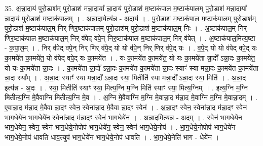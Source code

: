 \documentclass[17pt]{extarticle}
\begin{document}
35. अ॒न्ना॒दाय॑ पुरो॒डाश॑म् पुरो॒डाश॑ मन्ना॒दाया᳚ न्ना॒दाय॑ पुरो॒डाश॑ म॒ष्टाक॑पाल म॒ष्टाक॑पालम् पुरो॒डाश॑ मन्ना॒दाया᳚ न्ना॒दाय॑ पुरो॒डाश॑ म॒ष्टाक॑पालम् । . अ॒न्ना॒दायेत्य॑न्न - अ॒दाय॑ । . पु॒रो॒डाश॑ म॒ष्टाक॑पाल म॒ष्टाक॑पालम् पुरो॒डाश॑म् पुरो॒डाश॑ म॒ष्टाक॑पाल॒म् निर् णिर॒ष्टाक॑पालम् पुरो॒डाश॑म् पुरो॒डाश॑ म॒ष्टाक॑पाल॒म् निः । . अ॒ष्टाक॑पाल॒म् निर् णिर॒ष्टाक॑पाल म॒ष्टाक॑पाल॒म् निर् व॑पेद् वपे॒न् निर॒ष्टाक॑पाल म॒ष्टाक॑पाल॒म् निर् व॑पेत् । . अ॒ष्टाक॑पाल॒मित्य॒ष्टा - क॒पा॒ल॒म् । . निर् व॑पेद् वपे॒न् निर् णिर् व॑पे॒द् यो यो व॑पे॒न् निर् णिर् व॑पे॒द् यः । . व॒पे॒द् यो यो व॑पेद् वपे॒द् यः का॒मये॑त का॒मये॑त॒ यो व॑पेद् वपे॒द् यः का॒मये॑त । . यः का॒मये॑त का॒मये॑त॒ यो यः का॒मये॑ता न्ना॒दो᳚ ऽन्ना॒दः का॒मये॑त॒ यो यः का॒मये॑ता न्ना॒दः । . का॒मये॑ता न्ना॒दो᳚ ऽन्ना॒दः का॒मये॑त का॒मये॑ता न्ना॒दः स्याꣳ॑ स्या मन्ना॒दः का॒मये॑त का॒मये॑ता न्ना॒दः स्या᳚म् । . अ॒न्ना॒दः स्याꣳ॑ स्या मन्ना॒दो᳚ ऽन्ना॒दः स्या॒ मितीति॑ स्या मन्ना॒दो᳚ ऽन्ना॒दः स्या॒ मिति॑ । . अ॒न्ना॒द इत्य॑न्न - अ॒दः । . स्या॒ मितीति॑ स्याꣳ स्या॒ मित्य॒ग्नि म॒ग्नि मिति॑ स्याꣳ स्या॒ मित्य॒ग्निम् । . इत्य॒ग्नि म॒ग्नि मितीत्य॒ग्नि मे॒वैवाग्नि मितीत्य॒ग्नि मे॒व । . अ॒ग्नि मे॒वैवाग्नि म॒ग्नि मे॒वान्ना॒द म॑न्ना॒द मे॒वाग्नि म॒ग्नि मे॒वान्ना॒दम् । . ए॒वान्ना॒द म॑न्ना॒द मे॒वैवा न्ना॒दꣳ स्वेन॒ स्वेना᳚न्ना॒द मे॒वैवा न्ना॒दꣳ स्वेन॑ । . अ॒न्ना॒दꣳ स्वेन॒ स्वेना᳚न्ना॒द म॑न्ना॒दꣳ स्वेन॑ भाग॒धेये॑न भाग॒धेये॑न॒ स्वेना᳚न्ना॒द म॑न्ना॒दꣳ स्वेन॑ भाग॒धेये॑न । . अ॒न्ना॒दमित्य॑न्न - अ॒दम् । . स्वेन॑ भाग॒धेये॑न भाग॒धेये॑न॒ स्वेन॒ स्वेन॑ भाग॒धेये॒नोपोप॑ भाग॒धेये॑न॒ स्वेन॒ स्वेन॑ भाग॒धेये॒नोप॑ । . भा॒ग॒धेये॒नोपोप॑ भाग॒धेये॑न भाग॒धेये॒नोप॑ धावति धाव॒त्युप॑ भाग॒धेये॑न भाग॒धेये॒नोप॑ धावति । . भा॒ग॒धेये॒नेति॑ भाग - धेये॑न । \newline
\end{document}
